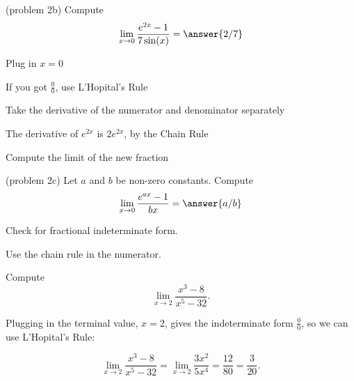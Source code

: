 \documentclass[handout]{ximera}
\begin{document}
\begin{problem}(problem 2b)
  Compute
  \[
  \lim_{x \to 0} \frac{e^{2x} -1}{7\sin(x)} = \answer{2/7}
  \]
  
    \begin{hint}
      Plug in $x=0$
    \end{hint}
    \begin{hint}
      If you got $\frac00$, use L'Hopital's Rule
    \end{hint}
    \begin{hint}
      Take the derivative of the numerator and denominator separately
    \end{hint}
		\begin{hint}
		 The derivative of $e^{2x}$ is $2e^{2x}$, by the Chain Rule
	  \end{hint}
		\begin{hint}
      Compute the limit of the new fraction
    \end{hint}
    
\end{problem}



\begin{problem}(problem 2c)
 Let $a$ and $b$ be non-zero constants. Compute
  \[
  \lim_{x \to 0} \frac{e^{ax} - 1}{bx} = \answer{a/b}
  \]
  
    \begin{hint}
      Check for fractional indeterminate form.
    \end{hint}
    
	  \begin{hint}
      Use the chain rule in the numerator.
    \end{hint}
	
\end{problem}


\begin{example}[example 3]
Compute  
       \[
            \lim_{x \to 2} \frac{x^3 - 8}{x^5 - 32}.
        \]
            
Plugging in the terminal value, $x=2$, gives 
the indeterminate form $\frac00$, so we can use L'Hopital's Rule:
 
\[\lim_{x \to 2} \frac{x^3 - 8}{x^5 - 32} = \lim_{x \to 2} \frac{3x^2}{5x^4} = \frac{12}{80} = \frac{3}{20}.\]
\end{example}
\end{document}
